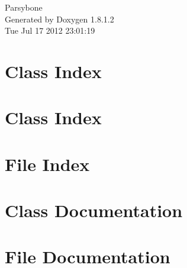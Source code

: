 \documentclass{book}
\begin{document}
\hypersetup{pageanchor=false,citecolor=blue}
\begin{titlepage}
\vspace*{7cm}
\begin{center}
{\Large Parsybone }\\
\vspace*{1cm}
{\large Generated by Doxygen 1.8.1.2}\\
\vspace*{0.5cm}
{\small Tue Jul 17 2012 23:01:19}\\
\end{center}
\end{titlepage}
\clearemptydoublepage
{}
\tableofcontents
\clearemptydoublepage
{}
\hypersetup{pageanchor=true,citecolor=blue}
\chapter{Class Index}

\chapter{Class Index}

\chapter{File Index}

\chapter{Class Documentation}







































\chapter{File Documentation}




\printindex
\end{document}
